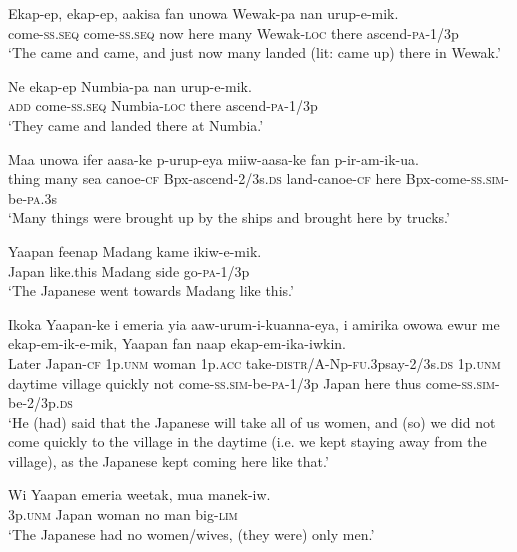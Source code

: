 \ea\label{ex:a:x27}
\gll  Ekap-ep,  ekap-ep,  aakisa  fan  unowa  Wewak-pa  nan  urup-e-mik. \\
come-\textsc{ss.seq}  come-\textsc{ss.seq}  now  here  many  Wewak-\textsc{loc} there  ascend-\textsc{pa}-1/3p \\
\glt ‘The came and came, and just now many landed (lit: came up) there in Wewak.’ \\
\z


\ea\label{ex:a:x28}
\gll  Ne  ekap-ep  Numbia-pa  nan  urup-e-mik. \\
\textsc{add}  come{}-\textsc{ss.seq}  Numbia-\textsc{loc}  there  ascend-\textsc{pa}-1/3p \\
\glt ‘They came and landed there at Numbia.’ \\
\z


\ea\label{ex:a:x29}
\gll  Maa  unowa  ifer  aasa-ke  p-urup-eya  miiw-aasa-ke fan  p-ir-am-ik-ua.\\
thing  many  sea  canoe-\textsc{cf}  Bpx-ascend-2/3s.\textsc{ds}  land-canoe-\textsc{cf} here  Bpx-come-\textsc{ss}.\textsc{sim}-be-\textsc{pa}.3s\\ 
\glt ‘Many things were brought up by the ships and brought here by trucks.’ \\
\z


\ea\label{ex:a:x30}
\gll  Yaapan  feenap  Madang  kame  ikiw-e-mik. \\
Japan  like.this  Madang  side  go-\textsc{pa}-1/3p \\
\glt ‘The Japanese went towards Madang like this.’ \\
\z


\ea\label{ex:a:x31}
\gll  Ikoka  Yaapan-ke  i  emeria  yia  aaw-urum-i-kuanna-eya,  i  amirika  owowa  ewur  me ekap-em-ik-e-mik,  Yaapan  fan  naap  ekap-em-ika-iwkin. \\
Later  Japan-\textsc{cf}  1p.\textsc{unm}  woman  1p.\textsc{acc}  take-\textsc{distr}/A-Np-\textsc{fu}.3psay-2/3s.\textsc{ds}  1p.\textsc{unm}  daytime  village  quickly  not come-\textsc{ss}.\textsc{sim}-be-\textsc{pa}-1/3p  Japan  here  thus  come-\textsc{ss}.\textsc{sim}-be-2/3p.\textsc{ds} \\
\glt ‘He (had) said that the Japanese will take all of us women, and (so) we did not come quickly to the village in the daytime (i.e. we kept staying away from the village), as the Japanese kept coming here like that.’ \\
\z


\ea\label{ex:a:x32}
\gll  Wi  Yaapan  emeria  weetak,  mua  manek-iw. \\
3p.\textsc{unm}  Japan  woman  no  man  big-\textsc{lim} \\
\glt ‘The Japanese had no women/wives, (they were) only men.’ \\
\z


